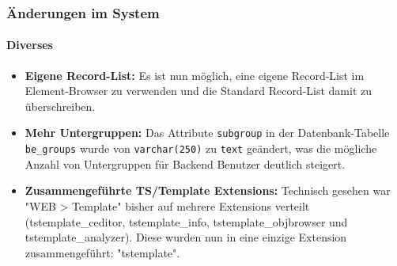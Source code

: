 \begin{frame}[fragile]
	\frametitle{Änderungen im System}
	\framesubtitle{Diverses}

	\begin{itemize}

		\item \textbf{Eigene Record-List:}\newline
			\small
				Es ist nun möglich, eine eigene Record-List im Element-Browser zu verwenden und die Standard Record-List damit zu überschreiben.
			\normalsize

		\item \textbf{Mehr Untergruppen:}\newline
			\small
				Das Attribute \texttt{subgroup} in der Datenbank-Tabelle \texttt{be\_groups} wurde von \texttt{varchar(250)} zu \texttt{text} geändert, was die mögliche Anzahl von Untergruppen für Backend Benutzer deutlich steigert.
			\normalsize

		\item \textbf{Zusammengeführte TS/Template Extensions:}\newline
			\small
				Technisch gesehen war "WEB > Template" bisher auf mehrere Extensions verteilt (tstemplate\_ceditor, tstemplate\_info, tstemplate\_objbrowser und tstemplate\_analyzer). Diese wurden nun in eine einzige Extension zusammengeführt: "tstemplate".
			\normalsize

	\end{itemize}
	
\end{frame}


